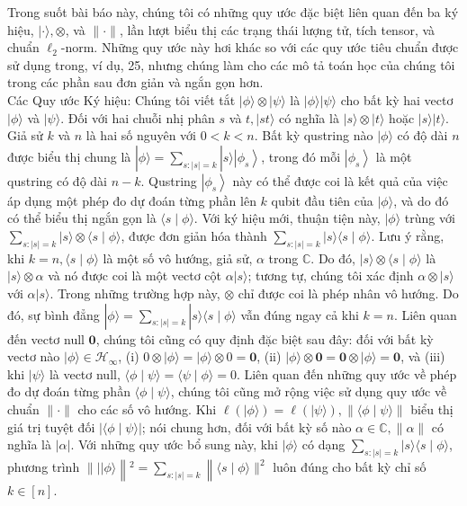 \documentclass[10pt]{article}
\begin{document}
Trong suốt bài báo này, chúng tôi có những quy ước đặc biệt liên quan đến ba ký hiệu, $|\cdot\rangle, \otimes$, và $\|\cdot\|$, lần lượt biểu thị các trạng thái lượng tử, tích tensor, và chuẩn $\ell_{2}$-norm. Những quy ước này hơi khác so với các quy ước tiêu chuẩn được sử dụng trong, ví dụ, 25, nhưng chúng làm cho các mô tả toán học của chúng tôi trong các phần sau đơn giản và ngắn gọn hơn.\\
Các Quy ước Ký hiệu: Chúng tôi viết tắt $|\phi\rangle \otimes|\psi\rangle$ là $|\phi\rangle|\psi\rangle$ cho bất kỳ hai vectơ $|\phi\rangle$ và $|\psi\rangle$. Đối với hai chuỗi nhị phân $s$ và $t,|s t\rangle$ có nghĩa là $|s\rangle \otimes|t\rangle$ hoặc $|s\rangle|t\rangle$. Giả sử $k$ và $n$ là hai số nguyên với $0<k<n$. Bất kỳ qustring nào $|\phi\rangle$ có độ dài $n$ được biểu thị chung là $|\phi\rangle=\sum_{s:|s|=k}|s\rangle\left|\phi_{s}\right\rangle$, trong đó mỗi $\left|\phi_{s}\right\rangle$ là một qustring có độ dài $n-k$. Qustring $\left|\phi_{s}\right\rangle$ này có thể được coi là kết quả của việc áp dụng một phép đo dự đoán từng phần lên $k$ qubit đầu tiên của $|\phi\rangle$, và do đó có thể biểu thị ngắn gọn là $\langle s \mid \phi\rangle$. Với ký hiệu mới, thuận tiện này, $|\phi\rangle$ trùng với $\sum_{s:|s|=k}|s\rangle \otimes\langle s \mid \phi\rangle$, được đơn giản hóa thành $\sum_{s:|s|=k}|s\rangle\langle s \mid \phi\rangle$. Lưu ý rằng, khi $k=n,\langle s \mid \phi\rangle$ là một số vô hướng, giả sử, $\alpha$ trong $\mathbb{C}$. Do đó, $|s\rangle \otimes\langle s \mid \phi\rangle$ là $|s\rangle \otimes \alpha$ và nó được coi là một vectơ cột $\alpha|s\rangle$; tương tự, chúng tôi xác định $\alpha \otimes|s\rangle$ với $\alpha|s\rangle$. Trong những trường hợp này, $\otimes$ chỉ được coi là phép nhân vô hướng. Do đó, sự bình đẳng $|\phi\rangle=\sum_{s:|s|=k}|s\rangle\langle s \mid \phi\rangle$ vẫn đúng ngay cả khi $k=n$. Liên quan đến vectơ null $\mathbf{0}$, chúng tôi cũng có quy định đặc biệt sau đây: đối với bất kỳ vectơ nào $|\phi\rangle \in \mathcal{H}_{\infty}$, (i) $0 \otimes|\phi\rangle=|\phi\rangle \otimes 0=\mathbf{0}$, (ii) $|\phi\rangle \otimes \mathbf{0}=\mathbf{0} \otimes|\phi\rangle=\mathbf{0}$, và (iii) khi $|\psi\rangle$ là vectơ null, $\langle\phi \mid \psi\rangle=\langle\psi \mid \phi\rangle=0$. Liên quan đến những quy ước về phép đo dự đoán từng phần $\langle\phi \mid \psi\rangle$, chúng tôi cũng mở rộng việc sử dụng quy ước về chuẩn $\|\cdot\|$ cho các số vô hướng. Khi $\ell(|\phi\rangle)=\ell(|\psi\rangle),\|\langle\phi \mid \psi\rangle\|$ biểu thị giá trị tuyệt đối $|\langle\phi \mid \psi\rangle|$; nói chung hơn, đối với bất kỳ số nào $\alpha \in \mathbb{C},\|\alpha\|$ có nghĩa là $|\alpha|$. Với những quy ước bổ sung này, khi $|\phi\rangle$ có dạng $\sum_{s:|s|=k}|s\rangle\langle s \mid \phi\rangle$, phương trình $\|||\phi\rangle\left\|^{2}=\sum_{s:|s|=k}\right\|\langle s \mid \phi\rangle \|^{2}$ luôn đúng cho bất kỳ chỉ số $k \in[n]$.
\end{document}
